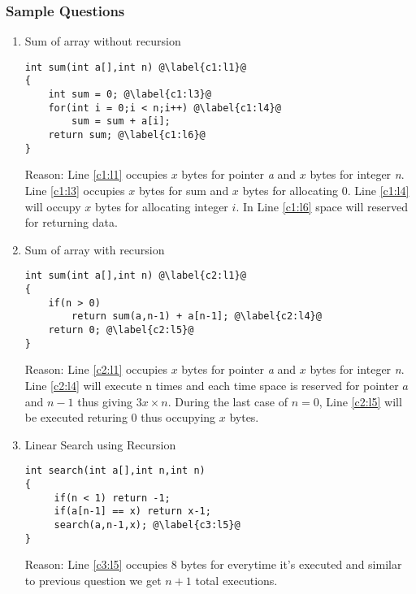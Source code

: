 \documentclass[./AlgorithmDesign.tex]{subfiles}
\begin{document}
\subsubsection*{Sample Questions}
\begin{enumerate}
\item Sum of array without recursion
\begin{mdframed}
\begin{lstlisting}[label=c1]
int sum(int a[],int n) @\label{c1:l1}@
{
    int sum = 0; @\label{c1:l3}@
    for(int i = 0;i < n;i++) @\label{c1:l4}@
        sum = sum + a[i]; 
    return sum; @\label{c1:l6}@
}
\end{lstlisting}

\vspace{3mm}

Reason: 
Line \ref{c1:l1} occupies $x$ bytes for pointer \textit{a} and $x$ bytes for integer \textit{n}. 
Line \ref{c1:l3} occupies $x$ bytes for sum and $x$ bytes for allocating 0. 
Line \ref{c1:l4} will occupy $x$ bytes for allocating integer $i$.
In Line \ref{c1:l6} space will reserved for returning data.
\end{mdframed}

\item Sum of array with recursion
\begin{mdframed}
\begin{lstlisting}[label=c2]
int sum(int a[],int n) @\label{c2:l1}@
{
    if(n > 0)
        return sum(a,n-1) + a[n-1]; @\label{c2:l4}@
    return 0; @\label{c2:l5}@
}
\end{lstlisting}

\vspace{3mm}

Reason: 
Line \ref{c2:l1} occupies $x$ bytes for pointer \textit{a} and $x$ bytes for integer \textit{n}. 
Line \ref{c2:l4} will execute n times and each time space is reserved for pointer $a$ and $n-1$ thus giving $3x\times n$. 
During the last case of $n = 0$, Line \ref{c2:l5} will be executed returing 0 thus occupying $x$ bytes.
\end{mdframed}

\item Linear Search using Recursion 
\begin{mdframed}
\begin{lstlisting}[label=c3]
int search(int a[],int n,int n) 
{
     if(n < 1) return -1;
     if(a[n-1] == x) return x-1;
     search(a,n-1,x); @\label{c3:l5}@
}
\end{lstlisting}

\vspace{3mm}

Reason: 
Line \ref{c3:l5} occupies $8$ bytes for everytime it's executed and similar to previous question we get $n+1$ total executions.
\end{mdframed}
\end{enumerate}
\end{document}
